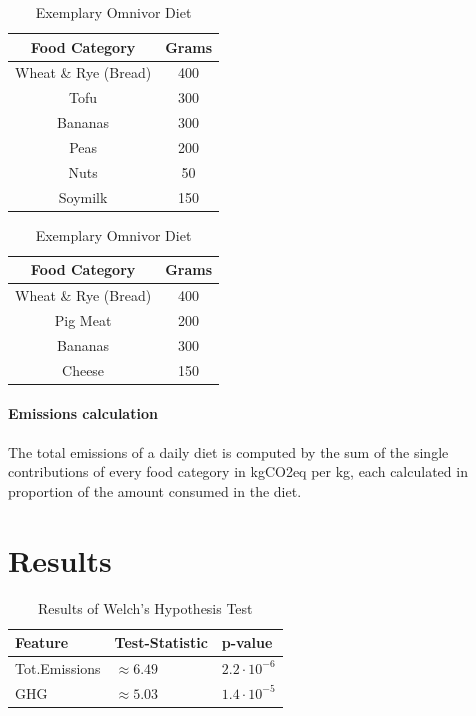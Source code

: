 \documentclass{article}
\begin{document}
\begin{table}[h]
\parbox{.45\linewidth}{
  \caption{Exemplary Plant-based  Diet}
\centering
\begin{tabular}{c c}
\toprule
Food Category & Grams\\
\midrule
Wheat \& Rye (Bread) & 400\\
Tofu & 300\\
Bananas & 300\\
Peas & 200\\
Nuts & 50\\
Soymilk & 150\\
\bottomrule
\end{tabular}
\label{tbl:plantdiet}
}
\hfill
\parbox{.45\linewidth}{
  \caption{Exemplary Omnivor  Diet}
\centering
\begin{tabular}{c c}
\toprule
Food Category & Grams\\
\midrule
Wheat \& Rye (Bread) & 400\\
Pig Meat & 200\\
Bananas & 300\\
Cheese & 150\\
\bottomrule
\end{tabular}
\label{tbl:omnidiet}
}
\end{table}

\paragraph*{Emissions calculation} The total emissions of a daily diet is computed by the sum of the single contributions of every food category in kgCO2eq per kg, each calculated in proportion of the amount consumed in the diet.

\section{Results}
\label{sec:results}

\begin{table}
  \caption{Results of  Welch's Hypothesis Test}
  \label{tbl:results-test}
  \centering
  \begin{tabular}{lll}
    \toprule
    Feature     & Test-Statistic   & p-value  \\
    \midrule
    Tot.Emissions &$\approx 6.49$  & $ 2.2\cdot10^{-6}  $  \\
    GHG  & $\approx 5.03 $  & $ 1.4\cdot10^{-5}$    \\
    \bottomrule
  \end{tabular}
\end{table}
\end{document}

